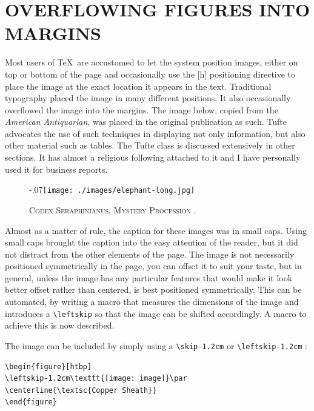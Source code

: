 \chapter[Overflowing Figures into Margins]{OVERFLOWING FIGURES INTO MARGINS}

Most users of \TeX\ are accustomed to let the system position images, either on top or bottom of the page and occasionally use the [h] positioning directive to place the image at the exact location it appears in the text. Traditional typography placed the image in many different positions. It also occasionally overflowed the image into the margins. The image below, copied from the \textit{American Antiquarian}, was placed in the original publication as such. Tufte advocates the use of such techniques in displaying not only information, but also other material such as tables. The Tufte class is discussed extensively in other sections. It has almost a religious following attached to it and I have personally used it for business reports.\citep{seraphini}

\begin{figure}[htbp]
\leftskip-.07\textwidth\texttt{[image: ./images/elephant-long.jpg]}\par
\centerline{\protect\textsc{Codex Seraphinianus, Mystery Procession \protect\citep{seraphini}}.}
\end{figure}

Almost as a matter of rule, the caption for these images was in small caps. Using small caps brought the caption into the easy attention of the reader, but it did not distract from the other elements of the page.
The image is not necessarily positioned symmetrically in the page, you can offset it to suit your taste, but in general, unless the image has any particular features that would make it look better offset rather than centered, is best positioned symmetrically. This can be automated, by writing a macro that measures the dimensions of the image and introduces a \verb+\leftskip+ so that the image can be shifted accordingly. A macro to achieve this is now described.


The image can be included by simply using a \verb+\skip-1.2cm+ or \verb+\leftskip-1.2cm+ :

\begin{verbatim}
\begin{figure}[htbp]
\leftskip-1.2cm\texttt{[image: image]}\par
\centerline{\textsc{Copper Sheath}}
\end{figure}
\end{verbatim}

\long{}






